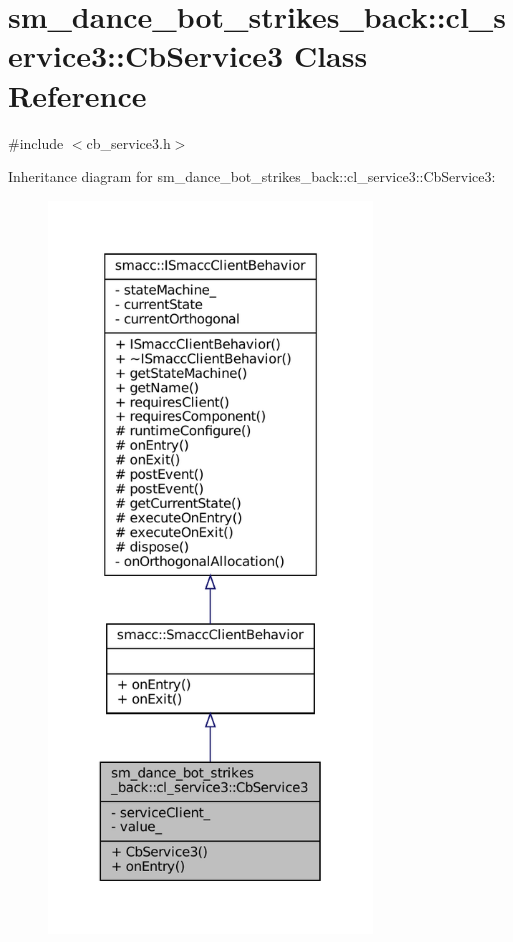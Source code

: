 \hypertarget{classsm__dance__bot__strikes__back_1_1cl__service3_1_1CbService3}{}\section{sm\+\_\+dance\+\_\+bot\+\_\+strikes\+\_\+back\+:\+:cl\+\_\+service3\+:\+:Cb\+Service3 Class Reference}
\label{classsm__dance__bot__strikes__back_1_1cl__service3_1_1CbService3}


{\ttfamily \#include $<$cb\+\_\+service3.\+h$>$}



Inheritance diagram for sm\+\_\+dance\+\_\+bot\+\_\+strikes\+\_\+back\+:\+:cl\+\_\+service3\+:\+:Cb\+Service3\+:
\nopagebreak
\begin{figure}[H]
\begin{center}
\leavevmode
\includegraphics[height=550pt]{classsm__dance__bot__strikes__back_1_1cl__service3_1_1CbService3__inherit__graph}
\end{center}
\end{figure}


